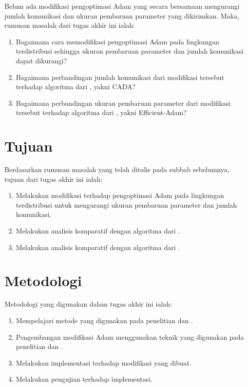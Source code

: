 Belum ada modifikasi pengoptimasi Adam yang secara bersamaan mengurangi jumlah komunikasi dan ukuran pembaruan parameter yang dikirimkan. Maka, rumusan masalah dari tugas akhir ini ialah:

\begin{enumerate}
  \item Bagaimana cara memodifikasi pengoptimasi Adam pada lingkungan terdistribusi sehingga ukuran pembaruan parameter dan jumlah komunikasi dapat dikurangi?
  \item Bagaimana perbandingan jumlah komunikasi dari modifikasi tersebut terhadap algoritma dari \textcite{Chen2021CADA}, yakni CADA?
  \item Bagaimana perbandingan ukuran pembaruan parameter dari modifikasi tersebut terhadap algoritma dari \textcite{Chen2022Efficient}, yakni Efficient-Adam?
\end{enumerate}

\section{Tujuan}

Berdasarkan rumusan masalah yang telah ditulis pada subbab sebelumnya, tujuan dari tugas akhir ini ialah:
\begin{enumerate}
  \item Melakukan modifikasi terhadap pengoptimasi Adam pada lingkungan terdistribusi untuk mengurangi ukuran pembaruan parameter dan jumlah komunikasi.
  \item Melakukan analisis komparatif dengan algoritma dari \textcite{Chen2021CADA}.
  \item Melakukan analisis komparatif dengan algoritma dari \textcite{Chen2022Efficient}.
\end{enumerate}

\section{Metodologi}

Metodologi yang digunakan dalam tugas akhir ini ialah:
\begin{enumerate}
  \item Mempelajari metode yang digunakan pada penelitian \textcite{Chen2021CADA} dan \textcite{Chen2022Efficient}.
  \item Pengembangan modifikasi Adam menggunakan teknik yang digunakan pada penelitian \textcite{Chen2021CADA} dan \textcite{Chen2022Efficient}.
  \item Melakukan implementasi terhadap modifikasi yang dibuat.
  \item Melakukan pengujian terhadap implementasi.
\end{enumerate}

